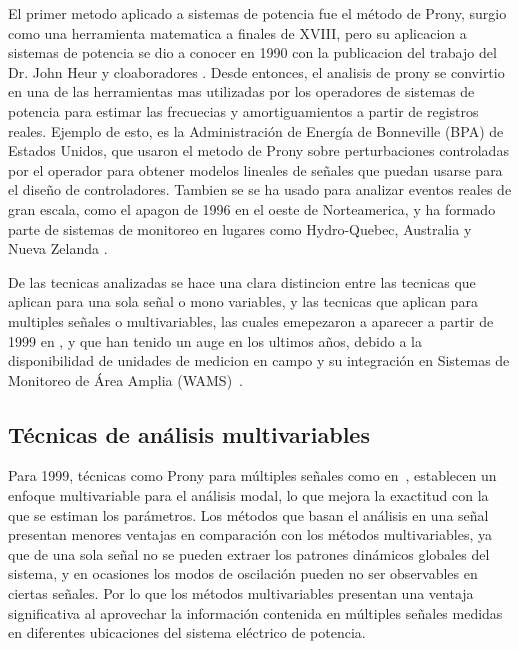 El primer metodo aplicado a sistemas de potencia fue el método de Prony, surgio como una herramienta matematica
a finales de XVIII, pero su aplicacion a sistemas de potencia se dio a conocer en 1990 con la publicacion del trabajo 
del Dr. John Heur y cloaboradores \cite{ieee2012}. Desde entonces, el analisis de prony se convirtio en una de 
las herramientas mas utilizadas por los operadores de sistemas de potencia para estimar las frecuecias y 
amortiguamientos a partir de registros reales. Ejemplo de esto, es la Administración de Energía de 
Bonneville (BPA) de Estados Unidos,  que usaron el metodo de Prony sobre perturbaciones controladas por el
operador para obtener modelos lineales de señales que puedan usarse para el diseño de controladores. Tambien se
se ha usado para analizar eventos reales de gran escala, como el apagon de 1996 en el oeste de Norteamerica, 
y ha formado parte de sistemas de monitoreo en lugares como Hydro-Quebec, Australia y Nueva Zelanda \cite{ieee2012}.

De las tecnicas analizadas se hace una clara distincion entre las tecnicas que aplican
para una sola señal o mono variables, y las tecnicas que aplican para multiples señales o multivariables, las 
cuales emepezaron a aparecer a partir de 1999 en \cite{Trudnowski1999}, y que han tenido un auge en los ultimos años,
debido a la disponibilidad de unidades de medicion en campo y su integración en Sistemas de Monitoreo de Área Amplia 
(WAMS)~\cite{Hauer2007}.

\subsection{Técnicas de análisis multivariables}

Para 1999, técnicas como Prony para múltiples señales como en~\cite{Trudnowski1999}, establecen un enfoque 
multivariable para el análisis modal, lo que mejora la exactitud con la que se estiman los parámetros. 
Los métodos que basan el análisis en una señal presentan menores ventajas en comparación con los métodos
multivariables, ya que de una sola señal no se pueden extraer los patrones dinámicos globales del 
sistema, y en ocasiones los modos de oscilación pueden no ser observables en ciertas señales. Por lo 
que los métodos multivariables presentan una ventaja significativa al aprovechar la información 
contenida en múltiples señales medidas en diferentes ubicaciones del sistema eléctrico de potencia.

